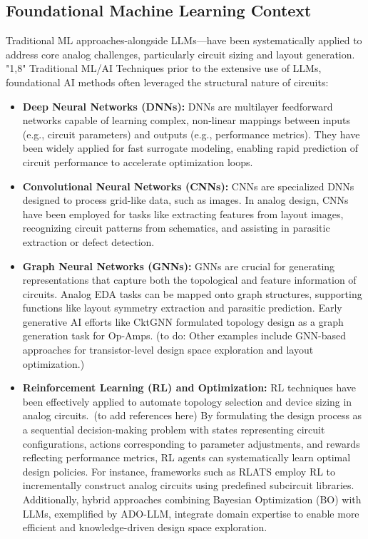 \documentclass{ieeeaccess}
\begin{document}
\subsection{Foundational Machine Learning Context}
Traditional ML approaches-alongside LLMs—have been systematically applied to address core analog challenges, particularly circuit sizing and layout generation. "1,8"
Traditional ML/AI Techniques prior to the extensive use of LLMs, foundational AI methods often leveraged the structural nature of circuits:

\begin{itemize}
    \item \textbf{Deep Neural Networks (DNNs):} DNNs are multilayer feedforward networks capable of learning complex, non-linear mappings between inputs (e.g., circuit parameters) and outputs (e.g., performance metrics). They have been widely applied for fast surrogate modeling, enabling rapid prediction of circuit performance to accelerate optimization loops.
    
    \item \textbf{Convolutional Neural Networks (CNNs):} CNNs are specialized DNNs designed to process grid-like data, such as images. In analog design, CNNs have been employed for tasks like extracting features from layout images, recognizing circuit patterns from schematics, and assisting in parasitic extraction or defect detection.

	\item \textbf{Graph Neural Networks (GNNs):} GNNs are crucial for generating representations that capture both the topological and feature information of circuits. Analog EDA tasks can be mapped onto graph structures, supporting functions like layout symmetry extraction and parasitic prediction. Early generative AI efforts like CktGNN formulated topology design as a graph generation task for Op-Amps. (to do: Other examples include GNN-based approaches for transistor-level design space exploration and layout optimization.)

	\item \textbf{Reinforcement Learning (RL) and Optimization:} RL techniques have been effectively applied to automate topology selection and device sizing in analog circuits.\ (to add references here) By formulating the design process as a sequential decision-making problem with states representing circuit configurations, actions corresponding to parameter adjustments, and rewards reflecting performance metrics, RL agents can systematically learn optimal design policies. \newline For instance, frameworks such as RLATS employ RL to incrementally construct analog circuits using predefined subcircuit libraries. Additionally, hybrid approaches combining Bayesian Optimization (BO) with LLMs, exemplified by ADO-LLM, integrate domain expertise to enable more efficient and knowledge-driven design space exploration.


\end{itemize}
\end{document}
